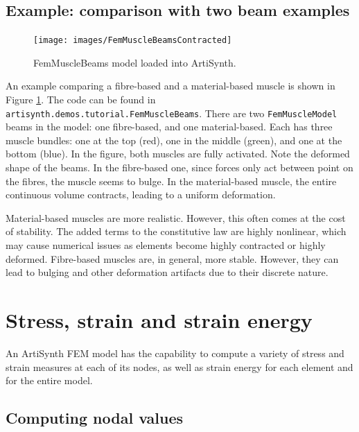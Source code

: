 \subsection{Example: comparison with two beam examples}
\label{FemMuscleBeams:sec}

\begin{figure}[ht]
	\centering
	\texttt{[image: images/FemMuscleBeamsContracted]}
	\caption{FemMuscleBeams model loaded into ArtiSynth.}
	\label{fig:fem:musclebeams}
\end{figure}

An example comparing a fibre-based and a material-based muscle is shown 
in Figure \ref{fig:fem:musclebeams}.  The code can be found in 
{\tt artisynth.demos.tutorial.FemMuscleBeams}.  There are two 
{\tt FemMuscleModel} beams in the model: one fibre-based, and one 
material-based.  Each has three muscle bundles: one at the top (red),
one in the middle (green), and one at the bottom (blue).  In the figure,
both muscles are fully activated.  Note the deformed shape of the beams.
In the fibre-based one, since forces only act between point on the fibres,
the muscle seems to bulge.  In the material-based muscle, the entire
continuous volume contracts, leading to a uniform deformation.  

Material-based muscles are more realistic.  However, this often comes at the cost
of stability.  The added terms to the constitutive law are highly nonlinear,
which may cause numerical issues as elements become highly contracted or
highly deformed.  Fibre-based muscles are, in general, more stable.  However,
they can lead to bulging and other deformation artifacts due to their discrete
nature.

\section{Stress, strain and strain energy}

An ArtiSynth FEM model has the capability to compute a variety of
stress and strain measures at each of its nodes, as well as strain
energy for each element and for the entire model.

\subsection{Computing nodal values}

